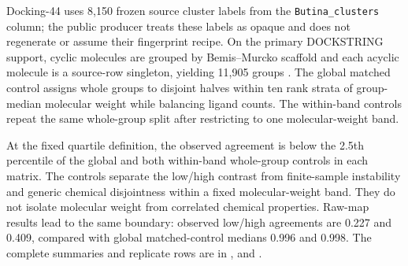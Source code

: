 \documentclass[11pt]{article}
\begin{document}
Docking-44 uses 8,150 frozen source cluster labels from the
\texttt{Butina\_clusters} column; the public producer treats these labels as
opaque and does not regenerate or assume their fingerprint recipe. On the
primary DOCKSTRING support, cyclic molecules are grouped by Bemis--Murcko
scaffold and each acyclic molecule is a source-row singleton, yielding 11,905
groups \cite{butina1999,murcko1996}. The global matched control assigns whole
groups to disjoint halves within ten rank strata of group-median molecular
weight while balancing ligand counts. The within-band controls repeat the same
whole-group split after restricting to one molecular-weight band.

\begin{table}[htbp]
\centering
\caption{Residual-map agreement across molecular-weight domains and controls.
The observed low/high value is one fixed contrast. Control brackets are central
95\% repeated-split ranges across 200 chemical-group assignments, not
confidence intervals.}
\label{tab:s3controls}
\small
{}
\end{table}

At the fixed quartile definition, the observed agreement is below the 2.5th
percentile of the global and both within-band whole-group controls in each
matrix. The controls separate the low/high contrast from finite-sample
instability and generic chemical disjointness within a fixed molecular-weight
band. They do not isolate molecular weight from correlated chemical properties.
Raw-map results lead to the same boundary: observed low/high agreements are
0.227 and 0.409, compared with global matched-control medians 0.996 and 0.998.
The complete summaries and replicate rows are in
,
and
.
\end{document}
